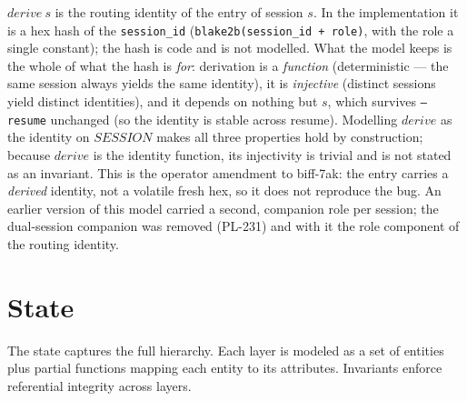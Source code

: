 \documentclass[a4paper,10pt,fleqn]{article}
\begin{document}
$derive~s$ is the routing identity of the entry of session $s$.  In the
implementation it is a hex hash of the \texttt{session\_id}
(\texttt{blake2b(session\_id + role)}, with the role a single constant);
the hash is code and is not modelled.  What the model keeps is the whole
of what the hash is \emph{for}: derivation is a \emph{function}
(deterministic --- the same session always yields the same identity), it
is \emph{injective} (distinct sessions yield distinct identities), and it
depends on nothing but $s$, which survives \texttt{--resume} unchanged
(so the identity is stable across resume).  Modelling $derive$ as the
identity on $SESSION$ makes all three properties hold by construction;
because $derive$ is the identity function, its injectivity is trivial and
is not stated as an invariant.  This is the operator amendment to
biff-7ak: the entry carries a \emph{derived} identity, not a volatile
fresh hex, so it does not reproduce the bug.  An earlier version of this
model carried a second, companion role per session; the dual-session
companion was removed (PL-231) and with it the role component of the
routing identity.

\section{State}

The state captures the full hierarchy.  Each layer is modeled as a set
of entities plus partial functions mapping each entity to its attributes.
Invariants enforce referential integrity across layers.
\end{document}
